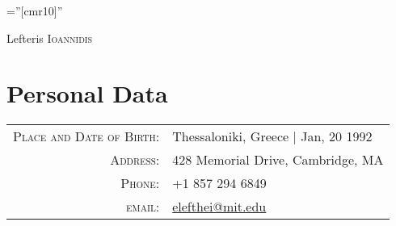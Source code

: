 \documentclass[lettersize,10pt]{article}
\begin{document}
\pagestyle{empty} %
\font\fb=''[cmr10]'' %

\par{\centering
		{\Huge Lefteris \textsc{Ioannidis}
	}\bigskip\par}

\section{Personal Data}

\begin{tabular}{rl}
    \textsc{Place and Date of Birth:} & Thessaloniki, Greece  | Jan, 20 1992 \\
    \textsc{Address:}   & 428 Memorial Drive, Cambridge, MA \\
    \textsc{Phone:}     & +1 857 294 6849\\
    \textsc{email:}     & \href{mailto:elefthei@mit.edu}{elefthei@mit.edu}
\end{tabular}

\end{document}
